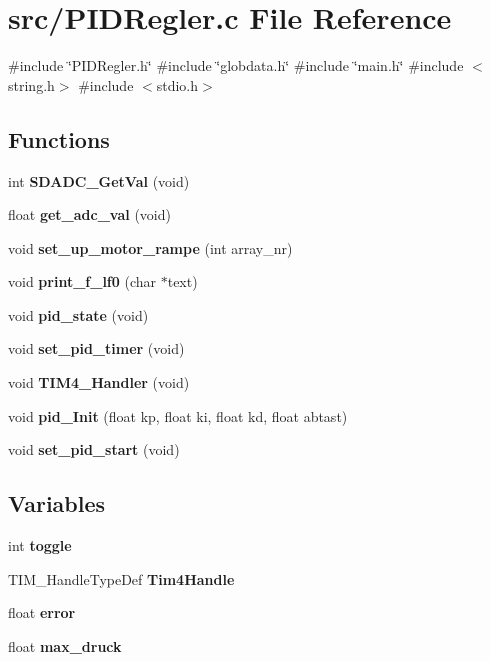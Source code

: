 \section{src/\+P\+I\+D\+Regler.c File Reference}
\label{_p_i_d_regler_8c}
{\ttfamily \#include \char`\"{}P\+I\+D\+Regler.\+h\char`\"{}}\newline
{\ttfamily \#include \char`\"{}globdata.\+h\char`\"{}}\newline
{\ttfamily \#include \char`\"{}main.\+h\char`\"{}}\newline
{\ttfamily \#include $<$string.\+h$>$}\newline
{\ttfamily \#include $<$stdio.\+h$>$}\newline
\subsection*{Functions}
\begin{DoxyCompactItemize}
\item 
int \textbf{ S\+D\+A\+D\+C\+\_\+\+Get\+Val} (void)
\item 
float \textbf{ get\+\_\+adc\+\_\+val} (void)
\item 
void \textbf{ set\+\_\+up\+\_\+motor\+\_\+rampe} (int array\+\_\+nr)
\item 
void \textbf{ print\+\_\+f\+\_\+lf0} (char $\ast$text)
\item 
void \textbf{ pid\+\_\+state} (void)
\item 
void \textbf{ set\+\_\+pid\+\_\+timer} (void)
\item 
void \textbf{ T\+I\+M4\+\_\+\+Handler} (void)
\item 
void \textbf{ pid\+\_\+\+Init} (float kp, float ki, float kd, float abtast)
\item 
void \textbf{ set\+\_\+pid\+\_\+start} (void)
\end{DoxyCompactItemize}
\subsection*{Variables}
\begin{DoxyCompactItemize}
\item 
int \textbf{ toggle}
\item 
T\+I\+M\+\_\+\+Handle\+Type\+Def \textbf{ Tim4\+Handle}
\item 
float \textbf{ error}
\item 
float \textbf{ max\+\_\+druck}
\end{DoxyCompactItemize}


